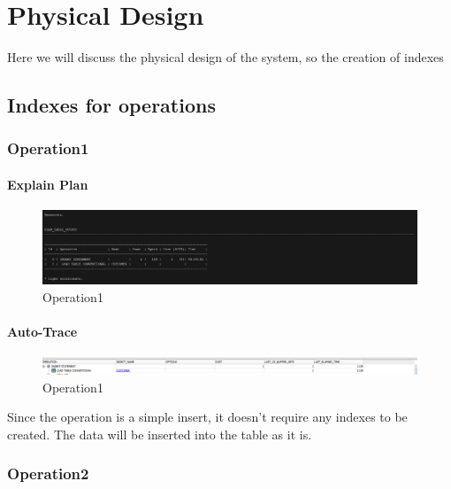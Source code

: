 \section{Physical Design}

Here we will discuss the physical design of the system, so the creation of indexes


\subsection{Indexes for operations}

\subsubsection{Operation1} 


\paragraph{Explain Plan} \leavevmode \newline

\begin{figure}[H]
    \centering
    \includegraphics[width=\textwidth]{images/ExPlan1.png}
    \caption{Operation1}
\end{figure}


\paragraph{Auto-Trace} \leavevmode \newline
\begin{figure}[H]
    \centering
    \includegraphics[width=\textwidth]{images/Op1Index.png}
    \caption{Operation1}
\end{figure}

Since the operation is a simple insert, it doesn't require any indexes to be created. The data will be inserted into the table as it is.

\subsubsection{Operation2}


